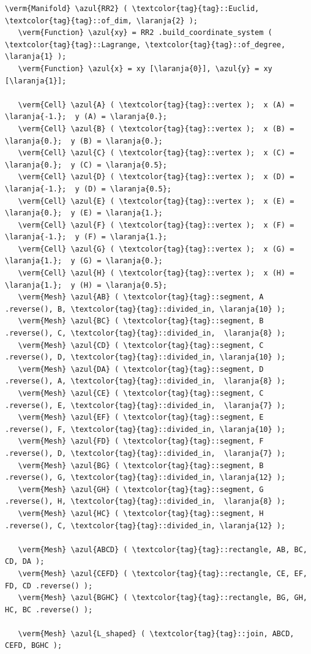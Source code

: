 \begin{Verbatim}[commandchars=\\\{\},formatcom=\small\tt,frame=single,
   label=parag-\ref{\numb section 1.\numb parag 4}.cpp,rulecolor=\color{coment},
   baselinestretch=0.94,framesep=2mm]
   \verm{Manifold} \azul{RR2} ( \textcolor{tag}{tag}::Euclid, \textcolor{tag}{tag}::of_dim, \laranja{2} );
   \verm{Function} \azul{xy} = RR2 .build_coordinate_system ( \textcolor{tag}{tag}::Lagrange, \textcolor{tag}{tag}::of_degree, \laranja{1} );
   \verm{Function} \azul{x} = xy [\laranja{0}], \azul{y} = xy [\laranja{1}];

   \verm{Cell} \azul{A} ( \textcolor{tag}{tag}::vertex );  x (A) = \laranja{-1.};  y (A) = \laranja{0.};
   \verm{Cell} \azul{B} ( \textcolor{tag}{tag}::vertex );  x (B) =  \laranja{0.};  y (B) = \laranja{0.};
   \verm{Cell} \azul{C} ( \textcolor{tag}{tag}::vertex );  x (C) =  \laranja{0.};  y (C) = \laranja{0.5};
   \verm{Cell} \azul{D} ( \textcolor{tag}{tag}::vertex );  x (D) = \laranja{-1.};  y (D) = \laranja{0.5};
   \verm{Cell} \azul{E} ( \textcolor{tag}{tag}::vertex );  x (E) =  \laranja{0.};  y (E) = \laranja{1.};
   \verm{Cell} \azul{F} ( \textcolor{tag}{tag}::vertex );  x (F) = \laranja{-1.};  y (F) = \laranja{1.};
   \verm{Cell} \azul{G} ( \textcolor{tag}{tag}::vertex );  x (G) =  \laranja{1.};  y (G) = \laranja{0.};
   \verm{Cell} \azul{H} ( \textcolor{tag}{tag}::vertex );  x (H) =  \laranja{1.};  y (H) = \laranja{0.5};
   \verm{Mesh} \azul{AB} ( \textcolor{tag}{tag}::segment, A .reverse(), B, \textcolor{tag}{tag}::divided_in, \laranja{10} );
   \verm{Mesh} \azul{BC} ( \textcolor{tag}{tag}::segment, B .reverse(), C, \textcolor{tag}{tag}::divided_in,  \laranja{8} );
   \verm{Mesh} \azul{CD} ( \textcolor{tag}{tag}::segment, C .reverse(), D, \textcolor{tag}{tag}::divided_in, \laranja{10} );
   \verm{Mesh} \azul{DA} ( \textcolor{tag}{tag}::segment, D .reverse(), A, \textcolor{tag}{tag}::divided_in,  \laranja{8} );
   \verm{Mesh} \azul{CE} ( \textcolor{tag}{tag}::segment, C .reverse(), E, \textcolor{tag}{tag}::divided_in,  \laranja{7} );
   \verm{Mesh} \azul{EF} ( \textcolor{tag}{tag}::segment, E .reverse(), F, \textcolor{tag}{tag}::divided_in, \laranja{10} );
   \verm{Mesh} \azul{FD} ( \textcolor{tag}{tag}::segment, F .reverse(), D, \textcolor{tag}{tag}::divided_in,  \laranja{7} );
   \verm{Mesh} \azul{BG} ( \textcolor{tag}{tag}::segment, B .reverse(), G, \textcolor{tag}{tag}::divided_in, \laranja{12} );
   \verm{Mesh} \azul{GH} ( \textcolor{tag}{tag}::segment, G .reverse(), H, \textcolor{tag}{tag}::divided_in,  \laranja{8} );
   \verm{Mesh} \azul{HC} ( \textcolor{tag}{tag}::segment, H .reverse(), C, \textcolor{tag}{tag}::divided_in, \laranja{12} );

   \verm{Mesh} \azul{ABCD} ( \textcolor{tag}{tag}::rectangle, AB, BC, CD, DA );
   \verm{Mesh} \azul{CEFD} ( \textcolor{tag}{tag}::rectangle, CE, EF, FD, CD .reverse() );
   \verm{Mesh} \azul{BGHC} ( \textcolor{tag}{tag}::rectangle, BG, GH, HC, BC .reverse() );

   \verm{Mesh} \azul{L_shaped} ( \textcolor{tag}{tag}::join, ABCD, CEFD, BGHC );
\end{Verbatim}

